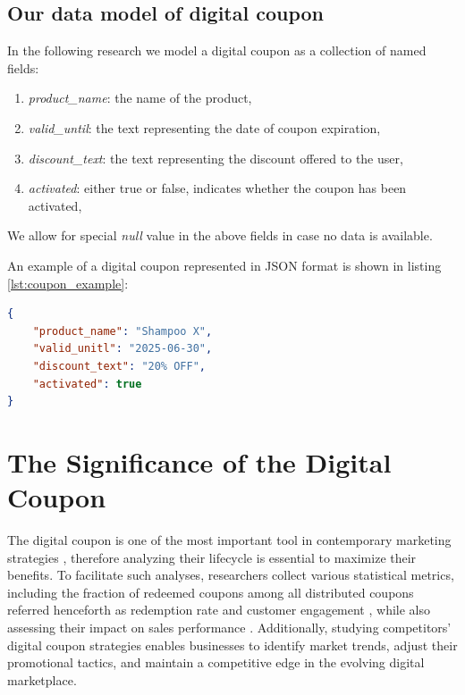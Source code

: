 \documentclass[licencjacka,en]{pracamgr}
\begin{document}
\subsection{Our data model of digital coupon}
\label{sec:coupon_model}
In the following research we model a digital coupon as a collection of named fields:
\begin{enumerate}
    \item \textit{product\_name}: the name of the product,
    \item \textit{valid\_until}: the text representing the date of coupon expiration,
    \item \textit{discount\_text}: the text representing the discount offered to the user,
    \item \textit{activated}: either true or false, indicates whether the coupon has been activated,
\end{enumerate}
We allow for special \textit{null} value in the above fields in case no data is available.

An example of a digital coupon represented in JSON format is shown in listing \ref{lst:coupon_example}:

\begin{lstlisting}[language=json, caption={Example of a digital coupon in JSON format}, label={lst:coupon_example}]
{
    "product_name": "Shampoo X",
    "valid_unitl": "2025-06-30",
    "discount_text": "20% OFF",
    "activated": true
}
\end{lstlisting}

\section{The Significance of the Digital Coupon}
The digital coupon is one of the most important tool in contemporary marketing strategies \cite{targeted_reminders}, therefore analyzing their lifecycle is essential to maximize their benefits. To facilitate such analyses, researchers collect various statistical metrics, including the fraction of redeemed coupons among all distributed coupons referred henceforth as redemption rate \cite{danaher2015} and customer engagement \cite{jayadharshini2023}, while also assessing their impact on sales performance \cite{jayadharshini2023}.  Additionally, studying competitors' digital coupon strategies enables businesses to identify market trends, adjust their promotional tactics, and maintain a competitive edge in the evolving digital marketplace.
\end{document}
